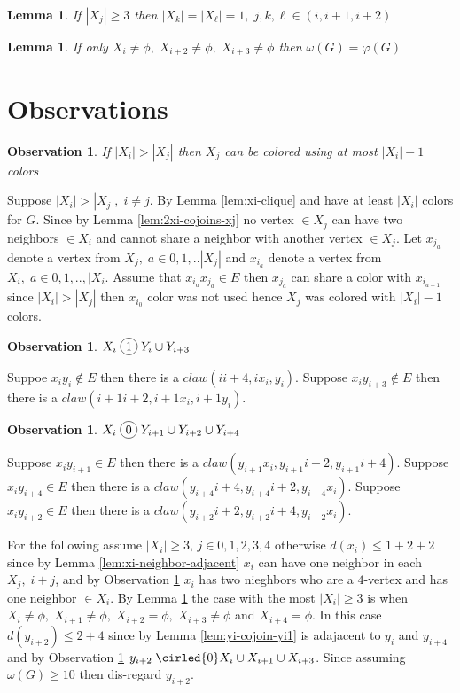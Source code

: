 \documentclass[12pt]{article}
\newcommand*\circled[1]{\tikz[baseline=(char.base)]{
            \node[shape=circle,draw,inner sep=2pt] (char) {#1};}}
\newtheorem{Lemma}[Theorem]{Lemma}
\newtheorem{Observation}[Theorem]{Observation}
\begin{document}
\begin{Lemma}\label{lem:three-consecutive-xi}
If $|X_j| \geq 3$ then $|X_k| = |X_\ell| = 1,\; j,k,\ell \in ({i,i+1,i+2})$
\end{Lemma}

\begin{Lemma}\label{lem:coloring-xi-xi2-xi3}
If only $X_i \neq \phi,\; X_{i+2} \neq \phi,\; X_{i+3} \neq \phi$ then $ \omega(G) = \varphi(G)$
\end{Lemma}

\section{Observations}\label{sec:obs}
\begin{Observation}\label{obs:xj-uses-xi-one}
If $|X_i| > |X_j|$ then $X_j$ can be colored using at most $|X_i| -1$ colors
\end{Observation} 
 Suppose $|X_i| > |X_j|,\; i \neq j$. By Lemma \ref{lem:xi-clique} and have at least $|X_i|$ colors for $G$. Since by Lemma \ref{lem:2xi-cojoins-xj} no vertex $\in X_j$ can have two neighbors $\in X_i$ and cannot share a neighbor with another vertex $\in X_j$. Let $x_j_a$ denote a vertex from $X_j,\; a \in {0, 1,..|X_j|}$ and $x_i_a$ denote a vertex from $X_i,\; a \in {0, 1,.., |X_i}$. Assume that $x_i_ax_j_a \in E$ then  $x_j_a$ can share a color with $x_i_{a+1}$ since $|X_i| > |X_j|$ then $x_i_0$ color was not used hence $X_j$ was colored with $|X_i| - 1$ colors.

\begin{Observation}\label{obs:xi-joins-yi}
$X_i \; \circled{1} \; Y_i \cup Y_{i+3}$
\end{Observation}
 Suppoe $x_iy_i \not \in E$ then there is a $claw (ii+4, ix_i, y_i)$. Suppose $x_iy_{i+3} \not \in E$ then there is a $claw (i+1i+2, i+1x_i, i+1y_i)$.

\begin{Observation}\label{obs:xi-cojoins-yi}
$X_i \; \circled{0} \; Y_{i+1} \cup Y_{i+2} \cup Y_{i+4}$
\end{Observation}
 Suppose $x_iy_{i+1} \in E$ then there is a $claw (y_{i+1}x_i, y_{i+1}i+2,y_{i+1}i+4)$. Suppose $x_iy_{i+4} \in E$ then there is a $claw (y_{i+4}i+4, y_{i+4}i+2, y_{i+4}x_i)$. Suppose $x_iy_{i+2} \in E$ then there is a $claw (y_{i+2}i+2, y_{i+2}i+4, y_{i+2}x_i)$.

For the following assume $|X_i| \geq 3,\, j \in {0,1,2,3,4}$ otherwise $d(x_i) \leq 1 + 2 + 2$ since by Lemma \ref{lem:xi-neighbor-adjacent} $x_i$ can have one neighbor in each $X_j,\; i+j$, and by Observation \ref{obs:xi-cojoins-yi} $x_i$ has two nieghbors who are a $4$-vertex and has one neighbor $\in X_i$. By Lemma \ref{lem:three-consecutive-xi} the case with the most $|X_i| \geq 3$ is when $X_i \neq \phi,\; X_{i+1} \neq \phi,\; X_{i+2} = \phi,\; X_{i+3} \neq \phi$ and $X_{i+4} = \phi$. In this case $d(y_{i+2}) \leq 2 + 4$ since by Lemma \ref{lem:yi-cojoin-yi1} is adajacent to $y_{i}$ and $y_{i+4}$ and by Observation \ref{obs:xi-cojoins-yi} $y_{i+2} \; \cirled{0} X_i \cup X_{i+1} \cup X_{i+3}$. Since assuming $\omega (G) \geq 10$ then dis-regard $y_{i+2}$.
\end{document}
